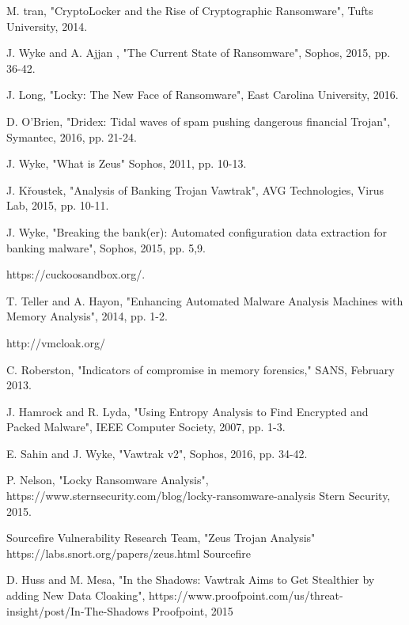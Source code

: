\documentclass[conference]{IEEEtran}
\newcommand\blankpage{%
    \null
    \thispagestyle{empty}%
    \addtocounter{page}{-1}%
    \newpage}
\begin{document}
\afterpage{\blankpage}
\newpage
\apptocmd{\thebibliography}{\setlength{\itemsep}{3pt}}{}{}
\begin{thebibliography}{}

M. tran, "CryptoLocker and the Rise of Cryptographic Ransomware",
Tufts University, 2014.

J. Wyke and A. Ajjan , "The Current State of Ransomware",
Sophos, 2015, pp. 36-42.

J. Long, "Locky: The New Face of Ransomware",
East Carolina University, 2016.

D. O'Brien, "Dridex: Tidal waves of spam pushing dangerous financial Trojan",
Symantec, 2016, pp. 21-24.

J. Wyke, "What is Zeus"
Sophos, 2011, pp. 10-13.

J. Křoustek, "Analysis of Banking Trojan Vawtrak", 
AVG Technologies, Virus Lab, 2015, pp. 10-11.

J. Wyke, "Breaking the bank(er): Automated configuration data extraction for banking malware", 
Sophos, 2015, pp. 5,9.

https://cuckoosandbox.org/.

T. Teller and A. Hayon, "Enhancing Automated Malware Analysis Machines with Memory Analysis",
2014, pp. 1-2.

http://vmcloak.org/

C. Roberston, "Indicators of compromise in memory forensics,"
SANS, February 2013. 

J. Hamrock and R. Lyda, "Using Entropy Analysis to Find Encrypted and Packed Malware", IEEE Computer Society, 2007, pp. 1-3.

E. Sahin and J. Wyke, "Vawtrak v2",
Sophos, 2016, pp. 34-42.

P. Nelson, "Locky Ransomware Analysis",
https://www.sternsecurity.com/blog/locky-ransomware-analysis
Stern Security, 2015.

Sourcefire Vulnerability Research Team, "Zeus Trojan Analysis"
https://labs.snort.org/papers/zeus.html
Sourcefire

D. Huss and M. Mesa, "In the Shadows: Vawtrak Aims to Get Stealthier by adding New Data Cloaking",
https://www.proofpoint.com/us/threat-insight/post/In-The-Shadows
Proofpoint, 2015

\end{thebibliography}


\afterpage{\blankpage}


\end{document}
